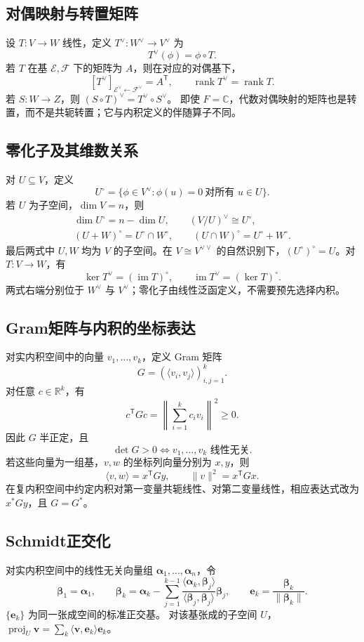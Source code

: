 \documentclass[../main.tex]{subfiles}
\begin{document}
\subsection{对偶映射与转置矩阵}
设 $T:V\to W$ 线性，定义 $T^\vee:W^\vee\to V^\vee$ 为
\[
T^\vee(\phi)=\phi\circ T.
\]
若 $T$ 在基 $\mathcal E,\mathcal F$ 下的矩阵为 $A$，则在对应的对偶基下，
\[
[T^\vee]_{\mathcal E^\vee\leftarrow\mathcal F^\vee}=A^{\mathsf T},\qquad
\operatorname{rank}T^\vee=\operatorname{rank}T.
\]
若 $S:W\to Z$，则 $(S\circ T)^\vee=T^\vee\circ S^\vee$。
即使 $F=\mathbb C$，代数对偶映射的矩阵也是转置，而不是共轭转置；它与内积定义的伴随算子不同。
\subsection{零化子及其维数关系}
对 $U\subseteq V$，定义
\[
U^\circ=\{\phi\in V^\vee:\phi(u)=0\ \text{对所有 }u\in U\}.
\]
若 $U$ 为子空间，$\dim V=n$，则
\begin{gather*}
\dim U^\circ=n-\dim U,\qquad (V/U)^\vee\cong U^\circ,\\
(U+W)^\circ=U^\circ\cap W^\circ,\qquad
(U\cap W)^\circ=U^\circ+W^\circ.
\end{gather*}
最后两式中 $U,W$ 均为 $V$ 的子空间。在 $V\cong V^{\vee\vee}$ 的自然识别下，$(U^\circ)^\circ=U$。对 $T:V\to W$，有
\[
\ker T^\vee=(\operatorname{im}T)^\circ,\qquad
\operatorname{im}T^\vee=(\ker T)^\circ.
\]
两式右端分别位于 $W^\vee$ 与 $V^\vee$；零化子由线性泛函定义，不需要预先选择内积。
\subsection{Gram矩阵与内积的坐标表达}
对实内积空间中的向量 $v_1,\ldots,v_k$，定义 Gram 矩阵
\[
G=(\langle v_i,v_j\rangle)_{i,j=1}^k.
\]
对任意 $c\in\mathbb R^k$，有
\[
c^{\mathsf T}Gc=\left\|\sum_{i=1}^kc_iv_i\right\|^2\ge0.
\]
因此 $G$ 半正定，且
\[
\det G>0\iff v_1,\ldots,v_k\text{ 线性无关}.
\]
若这些向量为一组基，$v,w$ 的坐标列向量分别为 $x,y$，则
\[
\langle v,w\rangle=x^{\mathsf T}Gy,\qquad \|v\|^2=x^{\mathsf T}Gx.
\]
在复内积空间中约定内积对第一变量共轭线性、对第二变量线性，相应表达式改为 $x^*Gy$，且 $G=G^*$。
\par\pagebreak[0]\begin{samepage}
\subsection{Schmidt正交化}
对实内积空间中的线性无关向量组 $\bm\alpha_1,\ldots,\bm\alpha_n$，令
\[
\bm\beta_1=\bm\alpha_1,\qquad
\bm\beta_k=\bm\alpha_k-\sum_{j=1}^{k-1}
\frac{\langle\bm\alpha_k,\bm\beta_j\rangle}{\langle\bm\beta_j,\bm\beta_j\rangle}\bm\beta_j,
\qquad \bm e_k=\frac{\bm\beta_k}{\|\bm\beta_k\|}.
\]
$\{\bm e_k\}$ 为同一张成空间的标准正交基。
对该基张成的子空间 $U$，$\operatorname{proj}_U\bm v=\sum_k\langle\bm v,\bm e_k\rangle\bm e_k$。
\par\end{samepage}\pagebreak[0]
\end{document}
